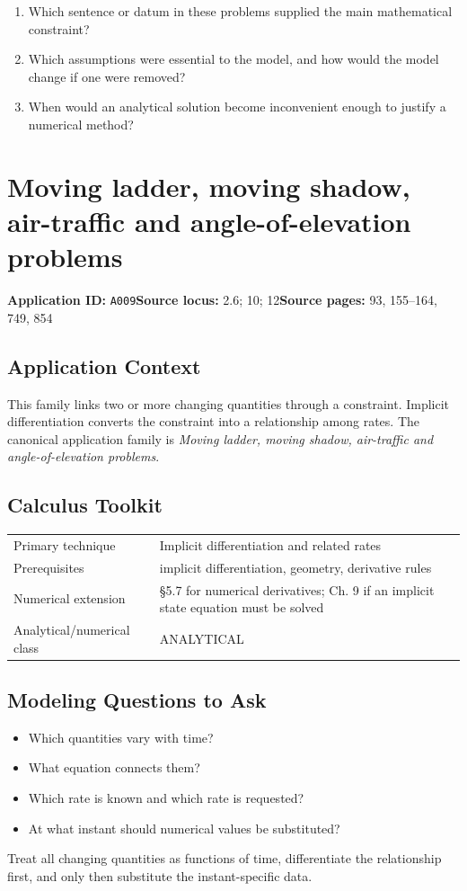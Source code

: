 \documentclass[11pt]{book}
\newcommand{\pid}[1]{\texttt{#1}}
\begin{document}
\begin{reflectionbox}\begin{enumerate}
\item Which sentence or datum in these problems supplied the main mathematical constraint?
\item Which assumptions were essential to the model, and how would the model change if one were removed?
\item When would an analytical solution become inconvenient enough to justify a numerical method?
\end{enumerate}\end{reflectionbox}
\chapter{Moving ladder, moving shadow, air-traffic and angle-of-elevation problems}\label{app:A009}
\textbf{Application ID:} \pid{A009}\quad \textbf{Source locus:} 2.6; 10; 12\quad \textbf{Source pages:} 93, 155–164, 749, 854
\section*{Application Context}
This family links two or more changing quantities through a constraint. Implicit differentiation converts the constraint into a relationship among rates. The canonical application family is \emph{Moving ladder, moving shadow, air-traffic and angle-of-elevation problems}.
\section*{Calculus Toolkit}
\begin{tabularx}{\textwidth}{@{}lX@{}}\toprule
Primary technique & Implicit differentiation and related rates \\
Prerequisites & implicit differentiation, geometry, derivative rules \\
Numerical extension & §5.7 for numerical derivatives; Ch. 9 if an implicit state equation must be solved \\
Analytical/numerical class & ANALYTICAL \\
\bottomrule\end{tabularx}
\section*{Modeling Questions to Ask}\begin{itemize}
\item Which quantities vary with time?
\item What equation connects them?
\item Which rate is known and which rate is requested?
\item At what instant should numerical values be substituted?
\end{itemize}
\begin{errorbox}Treat all changing quantities as functions of time, differentiate the relationship first, and only then substitute the instant-specific data.\end{errorbox}
\end{document}
